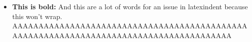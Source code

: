\begin{itemize}

	\item \textbf{This is bold:} And this are a lot of words for an issue in latexindent because this won't wrap. AAAAAAAAAAAAAAAAAAAAAAAAAAAAAAAAAAAAAAAAAAAAAAAAAAAAAAAAAAAAAAAAAAAAAAAAAAAAAAAAAAAAAAA

\end{itemize}

